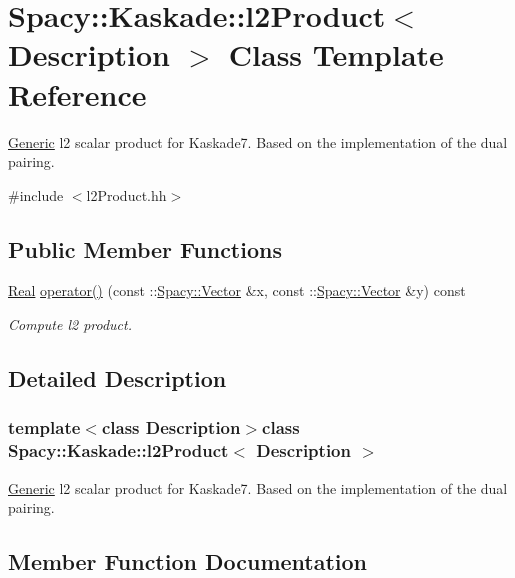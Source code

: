 \hypertarget{classSpacy_1_1Kaskade_1_1l2Product}{}\section{Spacy\+:\+:Kaskade\+:\+:l2\+Product$<$ Description $>$ Class Template Reference}
\label{classSpacy_1_1Kaskade_1_1l2Product}


\hyperlink{namespaceSpacy_1_1Generic}{Generic} l2 scalar product for Kaskade7. Based on the implementation of the dual pairing.  




{\ttfamily \#include $<$l2\+Product.\+hh$>$}

\subsection*{Public Member Functions}
\begin{DoxyCompactItemize}
\item 
\hyperlink{classSpacy_1_1Real}{Real} \hyperlink{classSpacy_1_1Kaskade_1_1l2Product_a22732c1b32cd7eb8a1792440e7298002}{operator()} (const \+::\hyperlink{classSpacy_1_1Vector}{Spacy\+::\+Vector} \&x, const \+::\hyperlink{classSpacy_1_1Vector}{Spacy\+::\+Vector} \&y) const 
\begin{DoxyCompactList}\small\item\em Compute l2 product. \end{DoxyCompactList}\end{DoxyCompactItemize}


\subsection{Detailed Description}
\subsubsection*{template$<$class Description$>$class Spacy\+::\+Kaskade\+::l2\+Product$<$ Description $>$}

\hyperlink{namespaceSpacy_1_1Generic}{Generic} l2 scalar product for Kaskade7. Based on the implementation of the dual pairing. 

\subsection{Member Function Documentation}
\hypertarget{classSpacy_1_1Kaskade_1_1l2Product_a22732c1b32cd7eb8a1792440e7298002}{}
